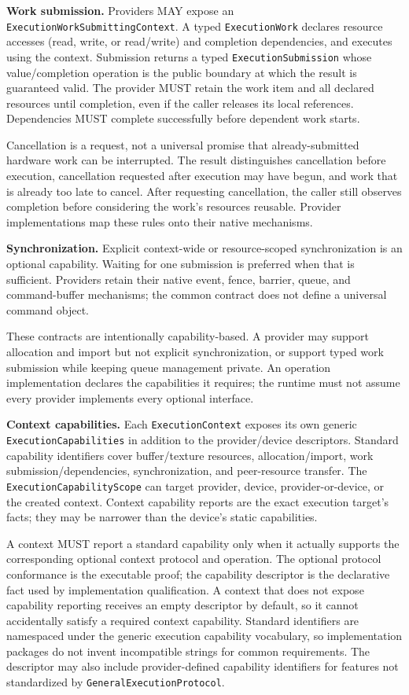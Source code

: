 \documentclass[11pt,a4paper,oneside]{article}
\begin{document}
\textbf{Work submission.} Providers MAY expose an \texttt{ExecutionWorkSubmittingContext}. A typed \texttt{ExecutionWork} declares resource accesses (read, write, or read/write) and completion dependencies, and executes using the context. Submission returns a typed \texttt{ExecutionSubmission} whose value/completion operation is the public boundary at which the result is guaranteed valid. The provider MUST retain the work item and all declared resources until completion, even if the caller releases its local references. Dependencies MUST complete successfully before dependent work starts.

Cancellation is a request, not a universal promise that already-submitted hardware work can be interrupted. The result distinguishes cancellation before execution, cancellation requested after execution may have begun, and work that is already too late to cancel. After requesting cancellation, the caller still observes completion before considering the work's resources reusable. Provider implementations map these rules onto their native mechanisms.

\textbf{Synchronization.} Explicit context-wide or resource-scoped synchronization is an optional capability. Waiting for one submission is preferred when that is sufficient. Providers retain their native event, fence, barrier, queue, and command-buffer mechanisms; the common contract does not define a universal command object.

These contracts are intentionally capability-based. A provider may support allocation and import but not explicit synchronization, or support typed work submission while keeping queue management private. An operation implementation declares the capabilities it requires; the runtime must not assume every provider implements every optional interface.

\textbf{Context capabilities.} Each \texttt{ExecutionContext} exposes its own generic \texttt{ExecutionCapabilities} in addition to the provider/device descriptors. Standard capability identifiers cover buffer/texture resources, allocation/import, work submission/dependencies, synchronization, and peer-resource transfer. The \texttt{ExecutionCapabilityScope} can target provider, device, provider-or-device, or the created context. Context capability reports are the exact execution target's facts; they may be narrower than the device's static capabilities.

A context MUST report a standard capability only when it actually supports the corresponding optional context protocol and operation. The optional protocol conformance is the executable proof; the capability descriptor is the declarative fact used by implementation qualification. A context that does not expose capability reporting receives an empty descriptor by default, so it cannot accidentally satisfy a required context capability. Standard identifiers are namespaced under the generic execution capability vocabulary, so implementation packages do not invent incompatible strings for common requirements. The descriptor may also include provider-defined capability identifiers for features not standardized by \texttt{GeneralExecution\allowbreak Protocol}.
\end{document}
